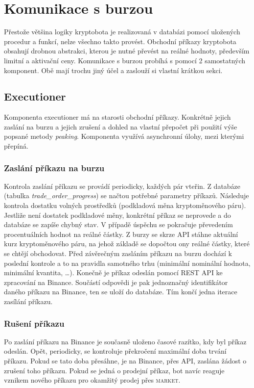 \section{Komunikace s burzou}
\label{subsec:exchanges-comm}
Přestože většina logiky kryptobota je realizovaná v databázi pomocí uložených procedur a funkcí, nelze všechno takto provést. Obchodní příkazy kryptobota obsahují drobnou abstrakci, kterou je
nutné převést na reálné hodnoty, především limitní a aktivační ceny. Komunikace s burzou probíhá s pomocí 2 samostatných komponent. Obě mají trochu jiný účel a zaslouží si vlastní krátkou sekci.

\subsection{Executioner}
Komponenta executioner má na starosti obchodní příkazy. Konkrétně jejich zaslání na burzu a jejich zrušení a dohled na vlastní přepočet při použití výše popsané metody \emph{peaking}. Komponenta
využívá asynchronní úlohy, mezi kterými přepíná.

\subsubsection{Zaslání příkazu na burzu}
Kontrola zaslání příkazu se provádí periodicky, každých pár vteřin. Z databáze (tabulka \emph{trade\_order\_progress}) se načtou potřebné parametry příkazů. Následuje kontrola
dostatku volných prostředků (podkladová měna kryptoměnového páru). Jestliže není dostatek podkladové měny, konkrétní příkaz se neprovede a do databáze se zapíše chybný stav. V případě
úspěchu se pokračuje převedením procentuálních hodnot na reálné částky. Z burzy se skrze API stáhne aktuální kurz kryptoměnového páru, na jehož základě se dopočtou ony reálné částky, které
se chtějí obchodovat. Před závěrečným zasláním příkazu na burzu dochází k poslední kontrole a to na pravidla samotného trhu (minimální nominální hodnota, minimální kvantita, \ldots).
Konečně je příkaz odeslán pomocí REST API ke zpracování na Binance. Součástí odpovědi je pak jednoznačný identifikátor daného příkazu na Binance, ten se uloží do databáze. Tím končí jedna
iterace zasílání příkazu.

\subsubsection{Rušení příkazu}
Po zaslání příkazu na Binance je současně uloženo časové razítko, kdy byl příkaz odeslán. Opět, periodicky, se kontroluje překročení maximální doba trvání příkazu. Pokud se tato doba přesáhne,
je na Binance, přes API, zaslána žádost o zrušení toho příkazu. Pokud se jedná o prodejní příkaz, bot navíc reaguje vznikem nového příkazu pro okamžitý prodej přes \textsc{market}.

